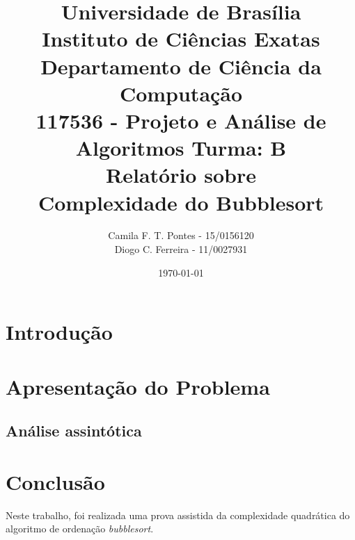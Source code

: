 \documentclass[12pt]{article}
\title{{\large Universidade de Brasília \\ Instituto de Ciências Exatas \\
Departamento de Ciência da Computação} \\[1cm]
117536 - Projeto e Análise de Algoritmos Turma: B\\[.5cm]
Relatório sobre {\\ \bf Complexidade do Bubblesort}}
\author{Camila F. T. Pontes - 15/0156120 \\
        Diogo C. Ferreira - 11/0027931}
\date{\today}
\begin{document}
\maketitle

\section{Introdução}


\section{Apresentação do Problema}

\subsection{Análise assintótica}



\section{Conclusão}
Neste trabalho, foi realizada uma prova assistida da complexidade quadrática do algoritmo de ordenação \textit{bubblesort}.



\end{document}
